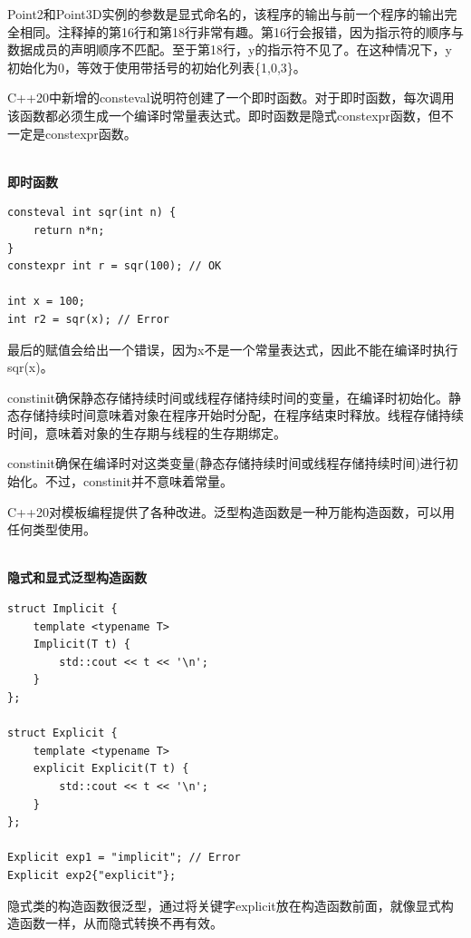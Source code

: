 Point2和Point3D实例的参数是显式命名的，该程序的输出与前一个程序的输出完全相同。注释掉的第16行和第18行非常有趣。第16行会报错，因为指示符的顺序与数据成员的声明顺序不匹配。至于第18行，y的指示符不见了。在这种情况下，y初始化为0，等效于使用带括号的初始化列表\{1,0,3\}。


C++20中新增的consteval说明符创建了一个即时函数。对于即时函数，每次调用该函数都必须生成一个编译时常量表达式。即时函数是隐式constexpr函数，但不一定是constexpr函数。

\hspace*{\fill} \\ %
\noindent
\textbf{即时函数}
\begin{lstlisting}[style=styleCXX]
consteval int sqr(int n) {
	return n*n;
}
constexpr int r = sqr(100); // OK

int x = 100;
int r2 = sqr(x); // Error
\end{lstlisting}

最后的赋值会给出一个错误，因为x不是一个常量表达式，因此不能在编译时执行sqr(x)。

constinit确保静态存储持续时间或线程存储持续时间的变量，在编译时初始化。静态存储持续时间意味着对象在程序开始时分配，在程序结束时释放。线程存储持续时间，意味着对象的生存期与线程的生存期绑定。

constinit确保在编译时对这类变量(静态存储持续时间或线程存储持续时间)进行初始化。不过，constinit并不意味着常量。


C++20对模板编程提供了各种改进。泛型构造函数是一种万能构造函数，可以用任何类型使用。

\hspace*{\fill} \\ %
\noindent
\textbf{隐式和显式泛型构造函数}
\begin{lstlisting}[style=styleCXX]
struct Implicit {
	template <typename T>
	Implicit(T t) {
		std::cout << t << '\n';
	}
};

struct Explicit {
	template <typename T>
	explicit Explicit(T t) {
		std::cout << t << '\n';
	}
};

Explicit exp1 = "implicit"; // Error
Explicit exp2{"explicit"};
\end{lstlisting}

隐式类的构造函数很泛型，通过将关键字explicit放在构造函数前面，就像显式构造函数一样，从而隐式转换不再有效。

